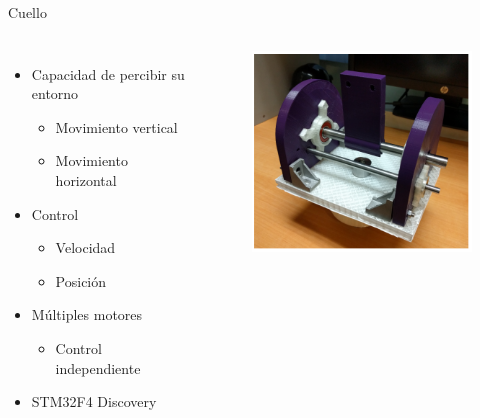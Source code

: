 \documentclass[10pt]{beamer}
\begin{document}
\begin{frame}{Cuello}
	\begin{columns}
			\begin{itemize}
            	\item Capacidad de percibir su entorno
                	\begin{itemize}
                		\item Movimiento vertical
                        \item Movimiento horizontal
                	\end{itemize}
                \item Control
                	\begin{itemize}
                		\item Velocidad
                        \item Posición
                	\end{itemize}
                \item Múltiples motores
                	\begin{itemize}
                		\item Control independiente
                	\end{itemize}
				\item STM32F4 Discovery
			\end{itemize}
			\begin{center}
				\begin{figure}
					\includegraphics[width=1\textwidth]{img/cuello.png}
				\end{figure}
			\end{center}
	\end{columns}
\end{frame}
\end{document}
